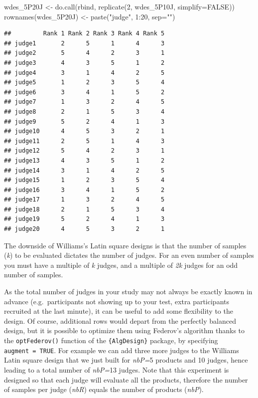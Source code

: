 \documentclass[
]{krantz}
\makeatletter
\newenvironment{Shaded}{\begin{snugshade}}{\end{snugshade}}
\newcommand{\AttributeTok}[1]{\textcolor[rgb]{0.61,0.61,0.61}{#1}}
\newcommand{\ConstantTok}[1]{\textcolor[rgb]{0,0,0}{#1}}
\newcommand{\DecValTok}[1]{\textcolor[rgb]{0.06,0.06,0.06}{#1}}
\newcommand{\FunctionTok}[1]{\textcolor[rgb]{0,0,0}{#1}}
\newcommand{\NormalTok}[1]{#1}
\newcommand{\OtherTok}[1]{\textcolor[rgb]{0.37,0.37,0.37}{#1}}
\newcommand{\SpecialCharTok}[1]{\textcolor[rgb]{0,0,0}{#1}}
\newcommand{\StringTok}[1]{\textcolor[rgb]{0.5,0.5,0.5}{#1}}
\newenvironment{kframe}{%
\medskip{}
\setlength{\fboxsep}{.8em}
 \def\at@end@of@kframe{}%
 \ifinner\ifhmode%
  \def\at@end@of@kframe{\end{minipage}}%
  \begin{minipage}{\columnwidth}%
 \fi\fi%
 \def\FrameCommand##1{\hskip\@totalleftmargin \hskip-\fboxsep
 \colorbox{shadecolor}{##1}\hskip-\fboxsep
     \hskip-\linewidth \hskip-\@totalleftmargin \hskip\columnwidth}%
 \MakeFramed {\advance\hsize-\width
   \@totalleftmargin\z@ \linewidth\hsize
   \@setminipage}}%
 {\par\unskip\endMakeFramed%
 \at@end@of@kframe}
\renewenvironment{Shaded}{\begin{kframe}}{\end{kframe}}
\makeatother
\begin{document}
\begin{Shaded}
\begin{Highlighting}[]
\NormalTok{wdes\_5P20J }\OtherTok{\textless{}{-}} \FunctionTok{do.call}\NormalTok{(rbind, }\FunctionTok{replicate}\NormalTok{(}\DecValTok{2}\NormalTok{, wdes\_5P10J, }\AttributeTok{simplify=}\ConstantTok{FALSE}\NormalTok{))}
\FunctionTok{rownames}\NormalTok{(wdes\_5P20J) }\OtherTok{\textless{}{-}} \FunctionTok{paste}\NormalTok{(}\StringTok{"judge"}\NormalTok{, }\DecValTok{1}\SpecialCharTok{:}\DecValTok{20}\NormalTok{, }\AttributeTok{sep=}\StringTok{""}\NormalTok{)}
\end{Highlighting}
\end{Shaded}

\begin{verbatim}
##         Rank 1 Rank 2 Rank 3 Rank 4 Rank 5
## judge1       2      5      1      4      3
## judge2       5      4      2      3      1
## judge3       4      3      5      1      2
## judge4       3      1      4      2      5
## judge5       1      2      3      5      4
## judge6       3      4      1      5      2
## judge7       1      3      2      4      5
## judge8       2      1      5      3      4
## judge9       5      2      4      1      3
## judge10      4      5      3      2      1
## judge11      2      5      1      4      3
## judge12      5      4      2      3      1
## judge13      4      3      5      1      2
## judge14      3      1      4      2      5
## judge15      1      2      3      5      4
## judge16      3      4      1      5      2
## judge17      1      3      2      4      5
## judge18      2      1      5      3      4
## judge19      5      2      4      1      3
## judge20      4      5      3      2      1
\end{verbatim}

The downside of Williams's Latin square designs is that the number of samples (\emph{k}) to be evaluated dictates the number of judges. For an even number of samples you must have a multiple of \emph{k} judges, and a multiple of \emph{2k} judges for an odd number of samples.

As the total number of judges in your study may not always be exactly known in advance (e.g.~participants not showing up to your test, extra participants recruited at the last minute), it can be useful to add some flexibility to the design. Of course, additional rows would depart from the perfectly balanced design, but it is possible to optimize them using Federov's algorithm thanks to the \texttt{optFederov()} function of the \texttt{\{AlgDesign\}} package, by specifying \texttt{augment\ =\ TRUE}. For example we can add three more judges to the Williams Latin square design that we just built for \emph{nbP=}5 products and 10 judges, hence leading to a total number of \emph{nbP=}13 judges. Note that this experiment is designed so that each judge will evaluate all the products, therefore the number of samples per judge (\emph{nbR}) equals the number of products (\emph{nbP}).
\end{document}

